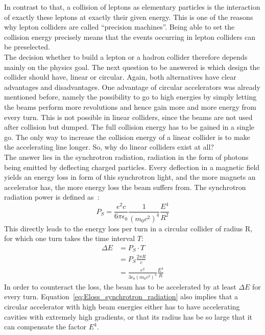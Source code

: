 In contrast to that, a collision of leptons as elementary particles is the interaction of exactly these leptons at exactly their given energy.
This is one of the reasons why lepton colliders are called ``precision machines''.
Being able to set the collision energy precisely means that the events occurring in lepton colliders can be preselected.\\
The decision whether to build a lepton or a hadron collider therefore depends mainly on the physics goal.
The next question to be answered is which design the collider should have, linear or circular.
Again, both alternatives have clear advantages and disadvantages.
One advantage of circular accelerators was already mentioned before, namely the possibility to go to high energies by simply letting the beams perform more revolutions and hence gain more and more energy from every turn.
This is not possible in linear colliders, since the beams are not used after collision but dumped.
The full collision energy has to be gained in a single go.
The only way to increase the collision energy of a linear collider is to make the accelerating line longer. So, why do linear colliders exist at all?\\
The answer lies in the synchrotron radiation, radiation in the form of photons being emitted by deflecting charged particles.
Every deflection in a magnetic field yields an energy loss in form of this synchrotron light, and the more magnets an accelerator has, the more energy loss the beam suffers from.
The synchrotron radiation power is defined as~\cite[p. 33]{Wille}:
\begin{equation}
 P_S = \frac{e^2c}{6\pi\epsilon_0}\frac{1}{(m_0c^2)^4}\frac{E^4}{R^2}
\end{equation}
This directly leads to the energy loss per turn in a circular collider of radius R, for which one turn takes the time interval $T$:
\begin{align}
 \Delta E &= P_S\cdot T\\
 &= P_S\frac{2\pi R}{c}\\
 &=\frac{e^2}{3\epsilon_0(m_0c^2)^4}\frac{E^4}{R} \label{eq:Eloss_synchrotron_radiation}
\end{align}
In order to counteract the loss, the beam has to be accelerated by at least $\Delta E$ for every turn.
Equation~\ref{eq:Eloss_synchrotron_radiation} also implies that a circular accelerator with high beam energies either has to have accelerating cavities with extremely high gradients, or that its radius has be so large that it can compensate the factor $E^4$.
